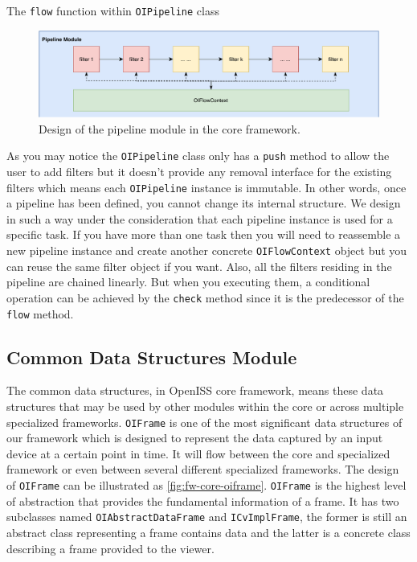\begin{algorithm}
    \caption{The \texttt{flow} function within \texttt{OIPipeline} class}
    \label{algo:fw-pipeline-flow}
\end{algorithm}

\begin{figure}
    \includegraphics[width=\linewidth]{figures/framework_core_pipeline2.pdf}
    \caption{Design of the pipeline module in the core framework.}
    \label{fig:fw-core-pipeline}
\end{figure}

As you may notice the \texttt{OIPipeline} class only has a \texttt{push} method
to allow the user to add filters but it doesn't provide any
removal interface for the existing filters which means each \texttt{OIPipeline}
instance is immutable. In other words, once a pipeline has been defined, you cannot change
its internal structure.
We design in such a way under the consideration that each pipeline instance is
used for a specific task. If you have more than one task then you will need to
reassemble a new pipeline instance and create another concrete
\texttt{OIFlowContext} object but you can reuse the same filter object if you
want. Also, all the filters residing in the pipeline are chained linearly. But
when you executing them, a conditional operation can be achieved by the
\texttt{check} method since it is the predecessor of the \texttt{flow} method.

\subsection{Common Data Structures Module}
\label{sec:fw-design-core-common-ds}

The common data structures, in OpenISS core framework, means these data structures
that may be used by other modules within the core or across multiple specialized
frameworks. \texttt{OIFrame} is one of the most significant data structures of our
framework which is designed to represent the data captured by an input device
at a certain point in time. It will flow between the core and
specialized framework or even between several different specialized frameworks.
The design of \texttt{OIFrame} can be illustrated as
\autoref{fig:fw-core-oiframe}. \texttt{OIFrame} is the highest level
of abstraction that provides the fundamental information of a frame. It has two
subclasses named \texttt{OIAbstractDataFrame} and \texttt{ICvImplFrame}, the
former is still an abstract class representing a frame contains data and the
latter is a concrete class describing a frame provided to the viewer.

